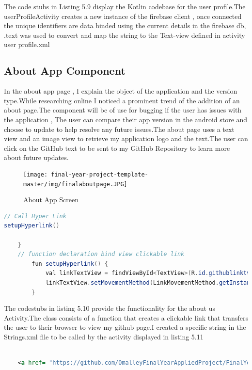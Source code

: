 The code stubs in Listing 5.9 display the Kotlin  codebase for the user profile.The userProfileActivity creates a new instance of the firebase client , once connected the unique identifiers are data binded using the current details in the firebase db, .text was used to convert and map the string to the Text-view  defined in activity user profile.xml




\subsection{About App Component   }


In the about app page , I explain the object of the application and the version type.While researching online I noticed a  prominent trend of the addition of an about page.The component will be of use for bugging if the user has issues with the application , The user can compare their app version in the android store and choose to update to help resolve any future issues.The about page uses a text view and an image view to retrieve my application logo and the text.The user can click on the GitHub text to be sent to my GitHub Repository to learn more about future updates.

 \begin{figure}[H]
  \centering
    \texttt{[image: final-year-project-template-master/img/finalaboutpage.JPG]}
     \caption{About App Screen}
\end{figure}



\begin{lstlisting}[language=Java, caption=Dashboard  About Us Kotlin code stubs ]
// Call Hyper Link
setupHyperlink()

    }
    // function declaration bind view clickable link
        fun setupHyperlink() {
            val linkTextView = findViewById<TextView>(R.id.githublinktv)
            linkTextView.setMovementMethod(LinkMovementMethod.getInstance());
        }
\end{lstlisting}

The codestubs in listing 5.10 provide the functionality for the about us Activity.The class consists of a function that creates  a clickable link that transfers the user to their browser to view my github page.I created a specific string in the Strings.xml file to be called by the activity displayed in listing 5.11



\begin{lstlisting}[language=XML, caption=Dashboard  About Us Kotlin code stubs ]

    <a href= "https://github.com/OmalleyFinalYearAppliedProject/FinalYearAppliedProjectGMIT">Find Updates via Github</a>
\end{lstlisting}

